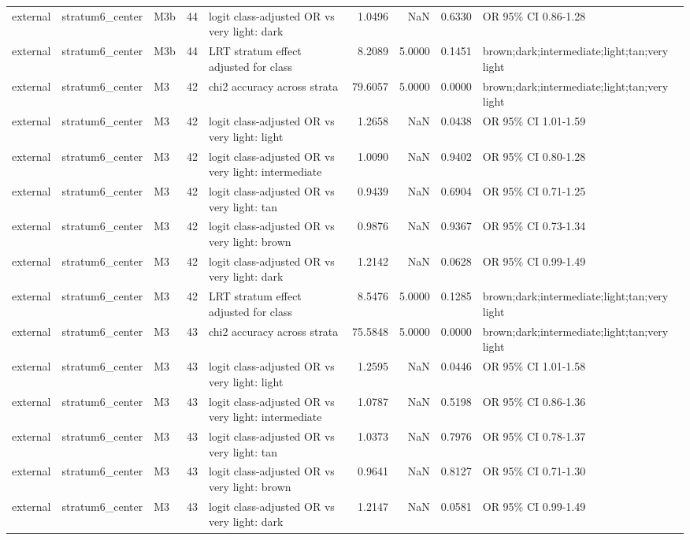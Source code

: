 \begin{tabular}{lllrlrrrl}
external & stratum6\_center & M3b & 44 & logit class-adjusted OR vs very light: dark & 1.0496 & NaN & 0.6330 & OR 95\% CI 0.86-1.28 \\
external & stratum6\_center & M3b & 44 & LRT stratum effect adjusted for class & 8.2089 & 5.0000 & 0.1451 & brown;dark;intermediate;light;tan;very light \\
external & stratum6\_center & M3 & 42 & chi2 accuracy across strata & 79.6057 & 5.0000 & 0.0000 & brown;dark;intermediate;light;tan;very light \\
external & stratum6\_center & M3 & 42 & logit class-adjusted OR vs very light: light & 1.2658 & NaN & 0.0438 & OR 95\% CI 1.01-1.59 \\
external & stratum6\_center & M3 & 42 & logit class-adjusted OR vs very light: intermediate & 1.0090 & NaN & 0.9402 & OR 95\% CI 0.80-1.28 \\
external & stratum6\_center & M3 & 42 & logit class-adjusted OR vs very light: tan & 0.9439 & NaN & 0.6904 & OR 95\% CI 0.71-1.25 \\
external & stratum6\_center & M3 & 42 & logit class-adjusted OR vs very light: brown & 0.9876 & NaN & 0.9367 & OR 95\% CI 0.73-1.34 \\
external & stratum6\_center & M3 & 42 & logit class-adjusted OR vs very light: dark & 1.2142 & NaN & 0.0628 & OR 95\% CI 0.99-1.49 \\
external & stratum6\_center & M3 & 42 & LRT stratum effect adjusted for class & 8.5476 & 5.0000 & 0.1285 & brown;dark;intermediate;light;tan;very light \\
external & stratum6\_center & M3 & 43 & chi2 accuracy across strata & 75.5848 & 5.0000 & 0.0000 & brown;dark;intermediate;light;tan;very light \\
external & stratum6\_center & M3 & 43 & logit class-adjusted OR vs very light: light & 1.2595 & NaN & 0.0446 & OR 95\% CI 1.01-1.58 \\
external & stratum6\_center & M3 & 43 & logit class-adjusted OR vs very light: intermediate & 1.0787 & NaN & 0.5198 & OR 95\% CI 0.86-1.36 \\
external & stratum6\_center & M3 & 43 & logit class-adjusted OR vs very light: tan & 1.0373 & NaN & 0.7976 & OR 95\% CI 0.78-1.37 \\
external & stratum6\_center & M3 & 43 & logit class-adjusted OR vs very light: brown & 0.9641 & NaN & 0.8127 & OR 95\% CI 0.71-1.30 \\
external & stratum6\_center & M3 & 43 & logit class-adjusted OR vs very light: dark & 1.2147 & NaN & 0.0581 & OR 95\% CI 0.99-1.49 \\

\end{tabular}
